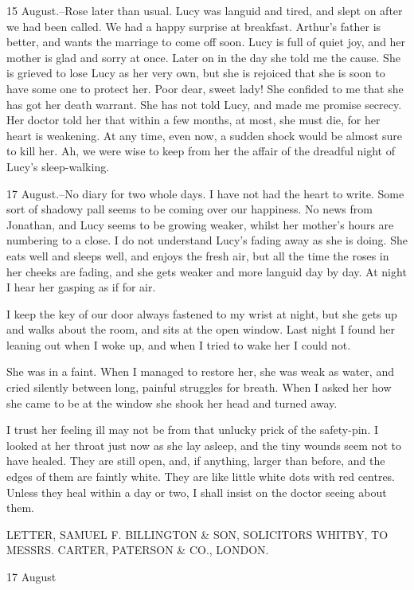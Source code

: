 15 August.--Rose later than usual. Lucy was languid and tired, and slept on after we had been called. We had a happy surprise at breakfast. Arthur's father is better, and wants the marriage to come off soon. Lucy is full of quiet joy, and her mother is glad and sorry at once. Later on in the day she told me the cause. She is grieved to lose Lucy as her very own, but she is rejoiced that she is soon to have some one to protect her. Poor dear, sweet lady! She confided to me that she has got her death warrant. She has not told Lucy, and made me promise secrecy. Her doctor told her that within a few months, at most, she must die, for her heart is weakening. At any time, even now, a sudden shock would be almost sure to kill her. Ah, we were wise to keep from her the affair of the dreadful night of Lucy's sleep-walking. 

17 August.--No diary for two whole days. I have not had the heart to write. Some sort of shadowy pall seems to be coming over our happiness. No news from Jonathan, and Lucy seems to be growing weaker, whilst her mother's hours are numbering to a close. I do not understand Lucy's fading away as she is doing. She eats well and sleeps well, and enjoys the fresh air, but all the time the roses in her cheeks are fading, and she gets weaker and more languid day by day. At night I hear her gasping as if for air. 

I keep the key of our door always fastened to my wrist at night, but she gets up and walks about the room, and sits at the open window. Last night I found her leaning out when I woke up, and when I tried to wake her I could not. 

She was in a faint. When I managed to restore her, she was weak as water, and cried silently between long, painful struggles for breath. When I asked her how she came to be at the window she shook her head and turned away. 

I trust her feeling ill may not be from that unlucky prick of the safety-pin. I looked at her throat just now as she lay asleep, and the tiny wounds seem not to have healed. They are still open, and, if anything, larger than before, and the edges of them are faintly white. They are like little white dots with red centres. Unless they heal within a day or two, I shall insist on the doctor seeing about them. 

LETTER, SAMUEL F. BILLINGTON & SON, SOLICITORS WHITBY, TO MESSRS. CARTER, PATERSON & CO., LONDON. 

17 August 

